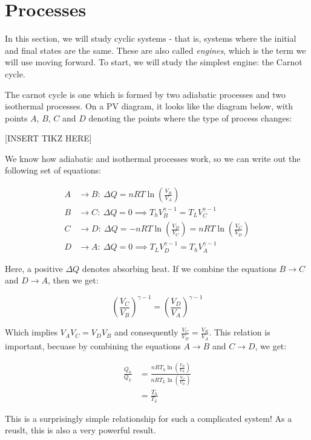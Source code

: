 \section{Processes} 

In this section, we will study cyclic systems - that is, systems where the initial and final states are the same. These are also called \textit{engines}, which is the term we will use moving forward. To start, we will study the simplest engine: the Carnot cycle. 

The carnot cycle is one which is formed by two adiabatic processes and two isothermal processes. On a PV diagram, it looks like the diagram below, with points $A$, $B$, $C$ and $D$ denoting the points where the type of process changes:

[INSERT TIKZ HERE]

We know how adiabatic and isothermal processes work, so we can write out the following set of equations:

\begin{align*}
A &\to B: \ \Delta Q = nRT \ln \left(\frac{V_B}{V_A}\right)\\
B &\to C: \ \Delta Q = 0 \implies T_hV_B^{\gamma -1} = T_LV_C^{\gamma -1} \\
C &\to D: \ \Delta Q = -nRT\ln\left(\frac{V_D}{V_C}\right) = nRT \ln \left(\frac{V_C}{V_D}\right)\\
D &\to A: \ \Delta Q = 0 \implies T_LV_D^{\gamma -1} = T_hV_A^{\gamma -1}
\end{align*}

Here, a positive $\Delta Q$ denotes absorbing heat. If we combine the equations $B \to C$ and $D \to A$, then we get:

\[ \left(\frac{V_C}{V_B}\right)^{\gamma -1} = \left(\frac{V_D}{V_A}\right)^{\gamma -1}\]

Which implies $V_AV_C = V_DV_B$ and consequently $\frac{V_C}{V_D} = \frac{V_B}{V_A}$. This relation is important, becuase by combining the equations $A \to B$ and $C \to D$, we get:

\begin{align*}
\frac{Q_h}{Q_L} &= \frac{nRT_h \ln \left(\frac{V_B}{V_A}\right)}{nRT_L \ln \left(\frac{V_C}{V_D}\right)}\\
&= \frac{T_h}{T_L}
\end{align*}

This is a surprisingly simple relationship for such a complicated system! As a reuslt, this is also a very powerful result.


